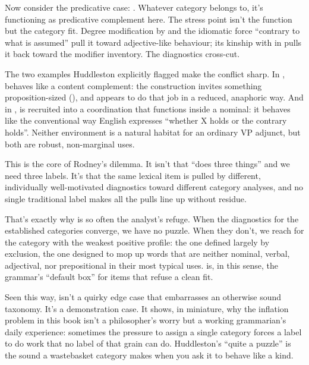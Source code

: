 Now consider the predicative case: . Whatever category  belongs to, it's functioning as predicative complement here. The stress point isn't the function but the category fit. Degree modification by  and the idiomatic force \enquote{contrary to what is assumed} pull it toward adjective-like behaviour; its kinship with  in  pulls it back toward the modifier inventory. The diagnostics cross-cut.

The two examples Huddleston explicitly flagged make the conflict sharp. In ,  behaves like a content complement: the construction invites something proposition-sized (), and  appears to do that job in a reduced, anaphoric way. And in ,  is recruited into a coordination that functions inside a nominal: it behaves like the conventional way English expresses \enquote{whether X holds or the contrary holds}. Neither environment is a natural habitat for an ordinary VP adjunct, but both are robust, non-marginal uses.

This is the core of Rodney's dilemma. It isn't that  \enquote{does three things} and we need three labels. It's that the same lexical item is pulled by different, individually well-motivated diagnostics toward different category analyses, and no single traditional label makes all the pulls line up without residue.

That's exactly why  is so often the analyst's refuge. When the diagnostics for the established categories converge, we have no puzzle. When they don't, we reach for the category with the weakest positive profile: the one defined largely by exclusion, the one designed to mop up words that are neither nominal, verbal, adjectival, nor prepositional in their most typical uses.  is, in this sense, the grammar's \enquote{default box} for items that refuse a clean fit.

Seen this way,  isn't a quirky edge case that embarrasses an otherwise sound taxonomy. It's a demonstration case. It shows, in miniature, why the inflation problem in this book isn't a philosopher's worry but a working grammarian's daily experience: sometimes the pressure to assign a single category forces a label to do work that no label of that grain can do. Huddleston's \enquote{quite a puzzle} is the sound a wastebasket category makes when you ask it to behave like a kind.

